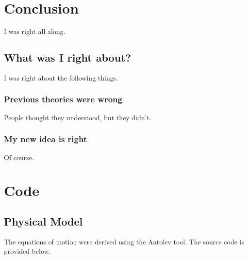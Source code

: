 \documentclass[a4paper,11pt]{report}
\begin{document}
\chapter{Conclusion}
\label{chap:conc}

I was right all along.

\section{What was I right about?}

I was right about the following things.

\subsection{Previous theories were wrong}

People thought they understood, but they didn't.

\subsection{My new idea is right}

Of course.


\clearpage
{}
{}



\appendix

%





\chapter{Code}
\label{app:code}

\section{Physical Model} \label{app:code:physmod}

The equations of motion were derived using the Autolev
tool\cite{autolev}.  The source code is provided below.
\end{document}
